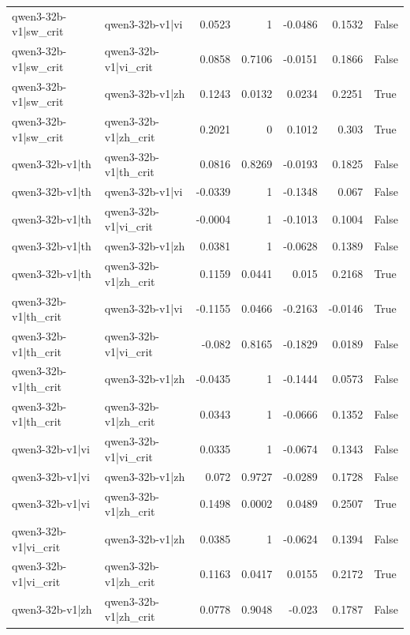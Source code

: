 \begin{table}
\begin{tabular}{l l r r r r l}
qwen3-32b-v1|sw_crit & qwen3-32b-v1|vi & 0.0523 & 1 & -0.0486 & 0.1532 & False \\
qwen3-32b-v1|sw_crit & qwen3-32b-v1|vi_crit & 0.0858 & 0.7106 & -0.0151 & 0.1866 & False \\
qwen3-32b-v1|sw_crit & qwen3-32b-v1|zh & 0.1243 & 0.0132 & 0.0234 & 0.2251 & True \\
qwen3-32b-v1|sw_crit & qwen3-32b-v1|zh_crit & 0.2021 & 0 & 0.1012 & 0.303 & True \\
qwen3-32b-v1|th & qwen3-32b-v1|th_crit & 0.0816 & 0.8269 & -0.0193 & 0.1825 & False \\
qwen3-32b-v1|th & qwen3-32b-v1|vi & -0.0339 & 1 & -0.1348 & 0.067 & False \\
qwen3-32b-v1|th & qwen3-32b-v1|vi_crit & -0.0004 & 1 & -0.1013 & 0.1004 & False \\
qwen3-32b-v1|th & qwen3-32b-v1|zh & 0.0381 & 1 & -0.0628 & 0.1389 & False \\
qwen3-32b-v1|th & qwen3-32b-v1|zh_crit & 0.1159 & 0.0441 & 0.015 & 0.2168 & True \\
qwen3-32b-v1|th_crit & qwen3-32b-v1|vi & -0.1155 & 0.0466 & -0.2163 & -0.0146 & True \\
qwen3-32b-v1|th_crit & qwen3-32b-v1|vi_crit & -0.082 & 0.8165 & -0.1829 & 0.0189 & False \\
qwen3-32b-v1|th_crit & qwen3-32b-v1|zh & -0.0435 & 1 & -0.1444 & 0.0573 & False \\
qwen3-32b-v1|th_crit & qwen3-32b-v1|zh_crit & 0.0343 & 1 & -0.0666 & 0.1352 & False \\
qwen3-32b-v1|vi & qwen3-32b-v1|vi_crit & 0.0335 & 1 & -0.0674 & 0.1343 & False \\
qwen3-32b-v1|vi & qwen3-32b-v1|zh & 0.072 & 0.9727 & -0.0289 & 0.1728 & False \\
qwen3-32b-v1|vi & qwen3-32b-v1|zh_crit & 0.1498 & 0.0002 & 0.0489 & 0.2507 & True \\
qwen3-32b-v1|vi_crit & qwen3-32b-v1|zh & 0.0385 & 1 & -0.0624 & 0.1394 & False \\
qwen3-32b-v1|vi_crit & qwen3-32b-v1|zh_crit & 0.1163 & 0.0417 & 0.0155 & 0.2172 & True \\
qwen3-32b-v1|zh & qwen3-32b-v1|zh_crit & 0.0778 & 0.9048 & -0.023 & 0.1787 & False \\
\bottomrule
\end{tabular}
\end{table}
